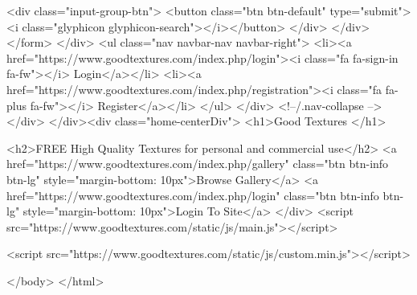                         <div class="input-group-btn">
                            <button class="btn btn-default" type="submit"><i class="glyphicon glyphicon-search"></i></button>
                        </div>
                    </div>
                </form>
            </div>
            <ul class="nav navbar-nav navbar-right">
                                    <li><a href="https://www.goodtextures.com/index.php/login"><i class="fa fa-sign-in fa-fw"></i> Login</a></li>
                    <li><a href="https://www.goodtextures.com/index.php/registration"><i class="fa fa-plus fa-fw"></i> Register</a></li>
                            </ul>
        </div>
        <!--/.nav-collapse -->
    </div>
</div><div class="home-centerDiv">
    <h1>Good Textures </h1>

    <h2>FREE High Quality Textures for personal and commercial use</h2>
    <a href="https://www.goodtextures.com/index.php/gallery" class="btn btn-info btn-lg" style="margin-bottom: 10px">Browse Gallery</a>
    <a href="https://www.goodtextures.com/index.php/login" class="btn btn-info btn-lg" style="margin-bottom: 10px">Login To Site</a>
</div>
<script src="https://www.goodtextures.com/static/js/main.js"></script>

<script src="https://www.goodtextures.com/static/js/custom.min.js"></script>

</body>
</html>